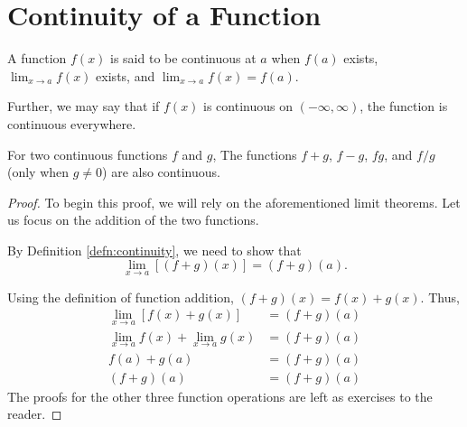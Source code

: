 \section{Continuity of a Function}
\begin{defn}[Continuity at $a$]\label{defn:continuity}
	A function $f(x)$ is said to be continuous at $a$ when $f(a)$ exists, $\lim_{x\to a} f(x)$ exists, and $\lim_{x\to a} f(x) = f(a)$.
\end{defn}
Further, we may say that if $f(x)$ is continuous on $(-\infty, \infty)$, the function is continuous everywhere.
\begin{thm}
	For two continuous functions $f$ and $g$, The functions $f+g$, $f-g$, $fg$, and $f/g$ (only when $g\neq 0$) are also continuous.
\end{thm}
\begin{proof}
	To begin this proof, we will rely on the aforementioned limit theorems. Let us focus on the addition of the two functions.
	
	By Definition \ref{defn:continuity}, we need to show that
	\[\lim_{x\to a}[(f+g)(x)] = (f+g)(a).\]
	
	Using the definition of function addition, $(f+g)(x) = f(x) + g(x)$. Thus,
	\begin{align*}
		\lim_{x\to a}[f(x)+g(x)] &= (f+g)(a) \\
		\lim_{x\to a} f(x) + \lim_{x\to a} g(x) &= (f+g)(a) \\
		f(a) + g(a) &= (f+g)(a) \\
		(f + g)(a) &= (f+g)(a)
	\end{align*}
	The proofs for the other three function operations are left as exercises to the reader.
\end{proof}